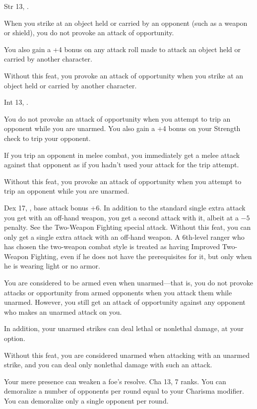 {}
{Str 13, .}
{When you strike at an object held or carried by an opponent (such as a weapon or shield), you do not provoke an attack of opportunity.

You also gain a +4 bonus on any attack roll made to attack an object held or carried by another character.}
{Without this feat, you provoke an attack of opportunity when you strike at an object held or carried by another character.}{}

{}
{Int 13, .}
{You do not provoke an attack of opportunity when you attempt to trip an opponent while you are unarmed. You also gain a +4 bonus on your Strength check to trip your opponent.

If you trip an opponent in melee combat, you immediately get a melee attack against that opponent as if you hadn't used your attack for the trip attempt.}
{Without this feat, you provoke an attack of opportunity when you attempt to trip an opponent while you are unarmed.}{}

{}
{Dex 17, , base attack bonus +6.}
{In addition to the standard single extra attack you get with an off-hand weapon, you get a second attack with it, albeit at a $-5$ penalty. See the Two-Weapon Fighting special attack.}
{Without this feat, you can only get a single extra attack with an off-hand weapon.}
{A 6th-level ranger who has chosen the two-weapon combat style is treated as having Improved Two-Weapon Fighting, even if he does not have the prerequisites for it, but only when he is wearing light or no armor.}

{}
{You are considered to be armed even when unarmed---that is, you do not provoke attacks or opportunity from armed opponents when you attack them while unarmed. However, you still get an attack of opportunity against any opponent who makes an unarmed attack on you.

In addition, your unarmed strikes can deal lethal or nonlethal damage, at your option.}
{Without this feat, you are considered unarmed when attacking with an unarmed strike, and you can deal only nonlethal damage with such an attack.}{}

{Your mere presence can weaken a foe's resolve.}
{Cha 13,  7 ranks.}
{You can demoralize a number of opponents per round equal to your Charisma modifier.}
{You can demoralize only a single opponent per round.}{}


